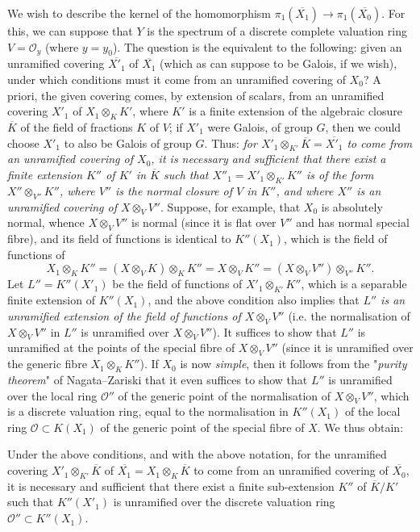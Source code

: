 We wish to describe the kernel of the homomorphism $\pi_1(\overline{X_1})\to\pi_1(\overline{X_0})$.
For this, we can suppose that $Y$ is the spectrum of a discrete complete valuation ring $V=\mathcal{O}_y$ (where $y=y_0$).
The question is the equivalent to the following:
given an unramified covering $\overline{X'_1}$ of $\overline{X_1}$ (which as can suppose to be Galois, if we wish), under which conditions must it come from an unramified covering of $X_0$?
A priori, the given covering comes, by extension of scalars, from an unramified covering $X'_1$ of $X_1\otimes_KK'$, where $K'$ is a finite extension of the algebraic closure $\overline{K}$ of the field of fractions $K$ of $V$;
if $X'_1$ were Galois, of group $G$, then we could choose $X'_1$ to also be Galois of group $G$.
Thus: \emph{for $X'_1\otimes_{K'}\overline{K}=\overline{X'_1}$ to come from an unramified covering of $X_0$, it is necessary and sufficient that there exist a finite extension $K''$ of $K'$ in $\overline{K}$ such that $X''_1=X'_1\otimes_{K'}K''$ is of the form $X''\otimes_{V''}K''$, where $V''$ is the normal closure of $V$ in $K''$, and where $X''$ is an unramified covering of $X\otimes_V V''$}.
Suppose, for example, that $X_0$ is absolutely normal, whence $X\otimes_V V''$ is normal (since it is flat over $V''$ and has normal special fibre), and its field of functions is identical to $K''(X_1)$, which is the field of functions of
\[
    X_1\otimes_K K''
    = (X\otimes_VK)\otimes_KK''
    = X\otimes_VK''
    = (X\otimes_VV'')\otimes_{V''}K''.
\]
Let $L''=K''(X'_1)$ be the field of functions of $X'_1\otimes_{K'}K''$, which is a separable finite extension of $K''(X_1)$, and the above condition also implies that \emph{$L''$ is an unramified extension of the field of functions of $X\otimes_VV''$} (i.e. the normalisation of $X\otimes_V V''$ in $L''$ is unramified over $X\otimes_VV''$).
It suffices to show that $L''$ is unramified at the points of the special fibre of $X\otimes_VV''$ (since it is unramified over the generic fibre $X_1\otimes_KK''$).
If $X_0$ is now \emph{simple}, then it follows from the "\emph{purity theorem}" of Nagata–Zariski that it even suffices to show that $L''$ is unramified over the local ring $\mathcal{O}''$ of the generic point of the normalisation of $X\otimes_VV''$, which is a discrete valuation ring, equal to the normalisation in $K''(X_1)$ of the local ring $\mathcal{O}\subset K(X_1)$ of the generic point of the special fibre of $X$.
We thus obtain:

\begin{corollary}\label{fga2-theorem-12-corollary-5}
    Under the above conditions, and with the above notation, for the unramified covering $X'_1\otimes_{K'}\overline{K}$ of $\overline{X_1}=X_1\otimes_K\overline{K}$ to come from an unramified covering of $\overline{X_0}$, it is necessary and sufficient that there exist a finite sub-extension $K''$ of $\overline{K}/K'$ such that $K''(X'_1)$ is unramified over the discrete valuation ring $\mathcal{O}''\subset K''(X_1)$.
\end{corollary}

